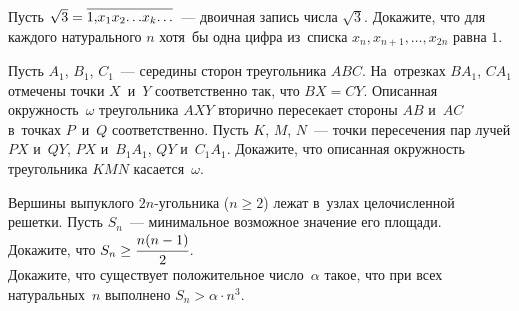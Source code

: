 


\begin{problems}
    \def\digits#1{\overline{\mathstrut#1}}%

\item
Пусть $\sqrt{3} = \digits{1{,}x_{1}x_{2}{\ldots}x_{k}{\ldots}}$~--- двоичная запись
числа $\sqrt{3}$.
Докажите, что для каждого натурального $n$ хотя~бы одна цифра из~списка
$x_{n}, x_{n+1}, \ldots, x_{2n}$ равна $1$.

\item
Пусть $A_1$, $B_1$, $C_1$~--- середины сторон треугольника $ABC$.
На~отрезках $BA_{1}$, $CA_{1}$ отмечены точки $X$~и~$Y$ соответственно так, что
$BX = CY$.
Описанная окружность~$\omega$ треугольника $AXY$ вторично пересекает стороны
$AB$ и~$AC$ в~точках $P$~и~$Q$ соответственно.
Пусть $K$, $M$, $N$~--- точки пересечения пар лучей $PX$ и~$QY$,
$PX$ и~$B_{1}A_{1}$, $QY$ и~$C_{1}A_{1}$.
Докажите, что описанная окружность треугольника $KMN$ касается~$\omega$.

\item
Вершины выпуклого $2n$-угольника ($n \geq 2$) лежат в~узлах целочисленной
решетки.
Пусть $S_{n}$~--- минимальное возможное значение его площади.
\\
\subproblem
Докажите, что $S_n \geq \cfrac{n(n - 1)}{2}$.
\\
\subproblem
Докажите, что существует положительное число~$\alpha$ такое, что при всех
натуральных~$n$ выполнено $S_n > \alpha \cdot n^3$.

\end{problems}

